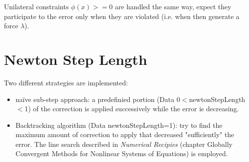 \documentclass{article}
\begin{document}
Unilateral constraints $\phi(x)>=0$ are handled the same way, expect they participate to the error only when they are violated (i.e. when then generate a force $\lambda$).


\section{Newton Step Length}

Two different strategies are implemented:
\begin{itemize}
\item naïve sub-step approach: a predefinied portion (Data 0$<$newtonStepLength$<$1) of the correction is applied successively while the error is decreasing.
\item Backtracking algorithm (Data newtonStepLength=1): try to find the maximum amount of correction to apply that decreased "sufficiently" the error. The line search described in \textit{Numerical Recipies} (chapter Globally Convergent Methods for Nonlinear Systems of Equations) is employed.
\end{itemize}
\end{document}
